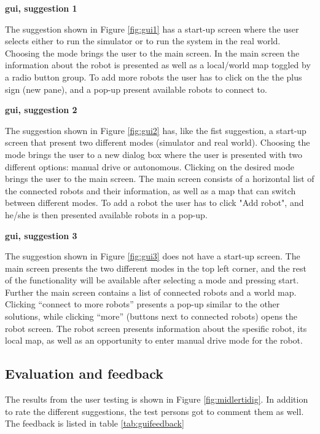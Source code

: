 \textbf{\acrlong{gui}, suggestion 1}

The suggestion shown in Figure \ref{fig:gui1} has a start-up screen where the user selects either to run the simulator or to run the system in the real world. Choosing the mode brings the user to the main screen. In the main screen the information about the robot is presented as well as a local/world map toggled by a radio button group. To add more robots the user has to click on the the plus sign (new pane), and a pop-up present available robots to connect to.

\textbf{\acrlong{gui}, suggestion 2}

The suggestion shown in Figure \ref{fig:gui2} has, like the fist suggestion, a start-up screen that present two different modes (simulator and real world). Choosing the mode brings the user to a new dialog box where the user is presented with two different options: manual drive or autonomous. Clicking on the desired mode brings the user to the main screen. The main screen consists of a horizontal list of the connected robots and their information, as well as a map that can switch between different modes. To add a robot the user has to click "Add robot", and he/she is then presented available robots in a pop-up.

\textbf{\acrlong{gui}, suggestion 3}

The suggestion shown in Figure \ref{fig:gui3} does not have a start-up screen. The main screen presents the two different modes in the top left corner, and the rest of the functionality will be available after selecting a mode and pressing start. Further the main screen contains a list of connected robots and a world map. Clicking ``connect to more robots'' presents a pop-up similar to the other solutions, while clicking ``more'' (buttons next to connected robots) opens the robot screen. The robot screen presents information about the spesific robot, its local map, as well as an opportunity to enter manual drive mode for the robot.

\subsection{Evaluation and feedback}
The results from the user testing is shown in Figure \ref{fig:midlertidig}. In addition to rate the different suggestions, the test persons got to comment them as well. The feedback is listed in table \ref{tab:guifeedback}

